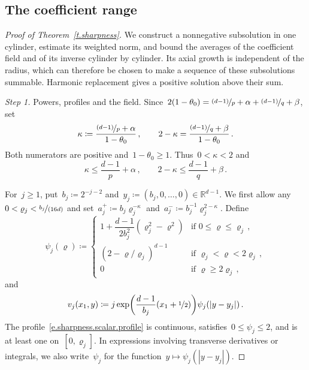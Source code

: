 \documentclass[11pt,letterpaper]{article}
\numberwithin{equation}{section}
\theoremstyle{definition}
\newcommand{\R}{\mathbb{R}}
\newcommand{\nf}{\nicefrac}
\begin{document}
\subsection{The coefficient range}
\label{ss.sharpness.range}

\begin{proof}[Proof of Theorem~\ref{t.sharpness}]
We construct a nonnegative subsolution in one cylinder, estimate its weighted norm, and bound the averages of the coefficient field and of its inverse cylinder by cylinder. Its axial growth is independent of the radius, which can therefore be chosen to make a sequence of these subsolutions summable. Harmonic replacement gives a positive solution above their sum.

\smallskip
\emph{Step 1.} Powers, profiles and the field. Since~$2(1-\theta_0)=\nf{(d-1)}p+\alpha+\nf{(d-1)}q+\beta$, set
\begin{equation*}
	\kappa\coloneqq\frac{\nf{(d-1)}p+\alpha}{1-\theta_0}\,,\qquad 2-\kappa=\frac{\nf{(d-1)}q+\beta}{1-\theta_0}\,.
\end{equation*}
Both numerators are positive and~$1-\theta_0\geq1$. Thus~$0<\kappa<2$ and
\begin{equation}
	\kappa\leq\frac{d-1}p+\alpha\,,\qquad 2-\kappa\leq\frac{d-1}q+\beta\,.
	\label{e.sharpness.scalar.powers}
\end{equation}

\smallskip
For~$j\geq1$, put~$b_j\coloneqq2^{-j-2}$ and~$y_j\coloneqq(b_j,0,\ldots,0)\in\R^{d-1}$. We first allow any~$0<\varrho_j<\nf{b_j}{(16d)}$ and set~$a_j^+\coloneqq b_j\varrho_j^{-\kappa}$ and~$a_j^-\coloneqq b_j^{-1}\varrho_j^{2-\kappa}$. Define
\begin{equation}
	\psi_j(\varrho)\coloneqq\begin{cases}1+\dfrac{d-1}{2b_j^2}(\varrho_j^2-\varrho^2)&\mbox{if }0\leq \varrho\leq\varrho_j\,,\\(2-\varrho/\varrho_j)^{d-1}&\mbox{if }\varrho_j<\varrho<2\varrho_j\,,\\0&\mbox{if }\varrho\geq2\varrho_j\,,\end{cases}
	\label{e.sharpness.scalar.profile}
\end{equation}
and
\begin{equation}
	v_j(x_1,y)\coloneqq j\exp\biggl(\frac{d-1}{b_j}(x_1+\nf12)\biggr)\psi_j(|y-y_j|)\,.
	\label{e.sharpness.scalar.subsolution}
\end{equation}
The profile~\eqref{e.sharpness.scalar.profile} is continuous, satisfies~$0\leq\psi_j\leq2$, and is at least one on~$[0,\varrho_j]$. In expressions involving transverse derivatives or integrals, we also write~$\psi_j$ for the function~$y\mapsto\psi_j(|y-y_j|)$.


\end{proof}
\end{document}
